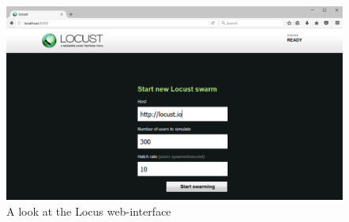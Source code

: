 \begin{figure}[H]
	\includegraphics[width=\linewidth]{Images/Implementation/locust_interface.png}
	\caption{A look at the Locus web-interface}
\end{figure}
\newpage
